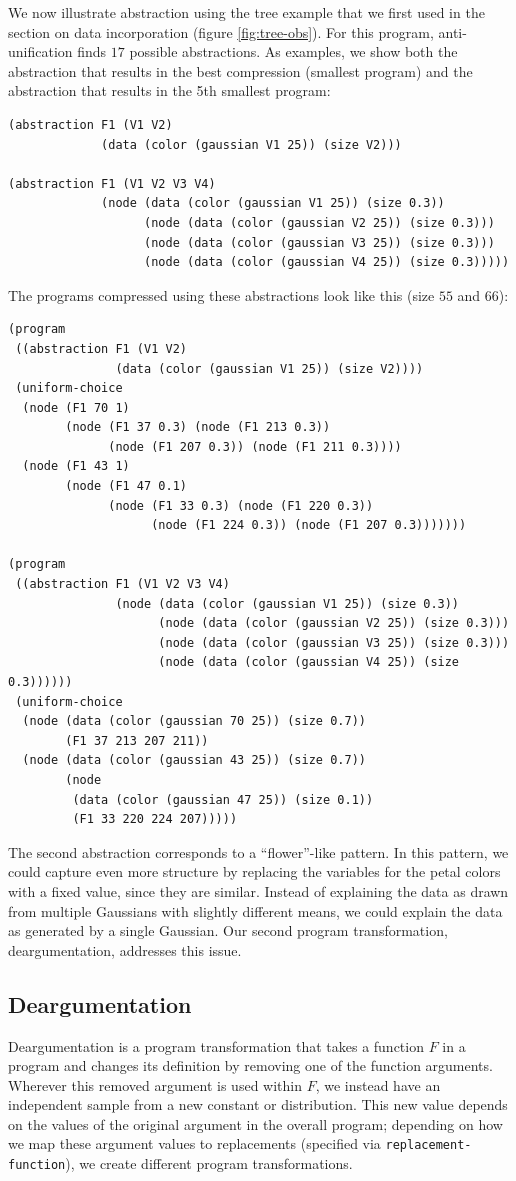 \documentclass[a4paper,10pt]{article}
\begin{document}
We now illustrate abstraction using the tree example that we first used in the section on data incorporation (figure \ref{fig:tree-obs}).
For this program, anti-unification finds $17$ possible abstractions. As examples, we show both the abstraction that results in the best compression (smallest program) and the abstraction that results in the 5th smallest program:
\begin{lstlisting}
(abstraction F1 (V1 V2)
             (data (color (gaussian V1 25)) (size V2)))

(abstraction F1 (V1 V2 V3 V4)
             (node (data (color (gaussian V1 25)) (size 0.3))
                   (node (data (color (gaussian V2 25)) (size 0.3)))
                   (node (data (color (gaussian V3 25)) (size 0.3)))
                   (node (data (color (gaussian V4 25)) (size 0.3)))))
\end{lstlisting}
The programs compressed using these abstractions look like this (size $55$ and $66$):
\begin{lstlisting}
(program
 ((abstraction F1 (V1 V2)
               (data (color (gaussian V1 25)) (size V2))))
 (uniform-choice
  (node (F1 70 1)
        (node (F1 37 0.3) (node (F1 213 0.3))
              (node (F1 207 0.3)) (node (F1 211 0.3))))
  (node (F1 43 1)
        (node (F1 47 0.1)
              (node (F1 33 0.3) (node (F1 220 0.3))
                    (node (F1 224 0.3)) (node (F1 207 0.3)))))))

(program
 ((abstraction F1 (V1 V2 V3 V4)
               (node (data (color (gaussian V1 25)) (size 0.3))
                     (node (data (color (gaussian V2 25)) (size 0.3)))
                     (node (data (color (gaussian V3 25)) (size 0.3)))
                     (node (data (color (gaussian V4 25)) (size 0.3))))))
 (uniform-choice
  (node (data (color (gaussian 70 25)) (size 0.7))
        (F1 37 213 207 211))
  (node (data (color (gaussian 43 25)) (size 0.7))
        (node
         (data (color (gaussian 47 25)) (size 0.1))
         (F1 33 220 224 207)))))
\end{lstlisting}
The second abstraction corresponds to a ``flower''-like pattern. In this pattern, we could capture even more structure by replacing the variables for the petal colors with a fixed value, since they are similar. Instead of explaining the data as drawn from multiple Gaussians with slightly different means, we could explain the data as generated by a single Gaussian. Our second program transformation, deargumentation, addresses this issue.
\subsection{Deargumentation}
Deargumentation is a program transformation that takes a function $F$ in a program and changes its definition by removing one of the function arguments. Wherever this removed argument is used within $F$, we instead have an independent sample from a new constant or distribution. This new value depends on the values of the original argument in the overall program; depending on how we map these argument values to replacements (specified via \texttt{replacement-function}), we create different program transformations.
\end{document}
